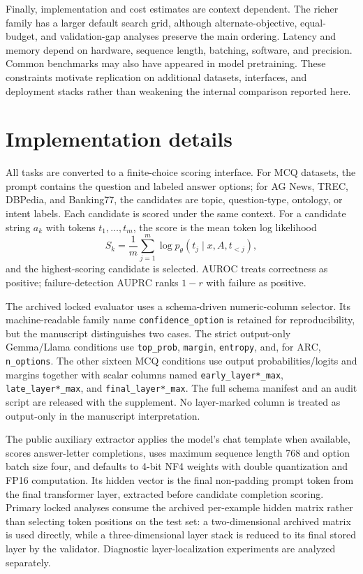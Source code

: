 \documentclass[preprint,12pt,authoryear]{elsarticle}
\begin{document}
Finally, implementation and cost estimates are context dependent. The richer family has a larger default search grid, although alternate-objective, equal-budget, and validation-gap analyses preserve the main ordering. Latency and memory depend on hardware, sequence length, batching, software, and precision. Common benchmarks may also have appeared in model pretraining. These constraints motivate replication on additional datasets, interfaces, and deployment stacks rather than weakening the internal comparison reported here.

\section{Implementation details}
All tasks are converted to a finite-choice scoring interface. For MCQ datasets, the prompt contains the question and labeled answer options; for AG News, TREC, DBPedia, and Banking77, the candidates are topic, question-type, ontology, or intent labels. Each candidate is scored under the same context. For a candidate string $a_k$ with tokens $t_1,\ldots,t_m$, the score is the mean token log likelihood
\begin{equation}
S_k=\frac{1}{m}\sum_{j=1}^{m}\log p_\theta(t_j\mid x,A,t_{<j}),
\end{equation}
and the highest-scoring candidate is selected. AUROC treats correctness as positive; failure-detection AUPRC ranks $1-r$ with failure as positive.

The archived locked evaluator uses a schema-driven numeric-column selector. Its machine-readable family name \texttt{confidence\_option} is retained for reproducibility, but the manuscript distinguishes two cases. The strict output-only Gemma/Llama conditions use \texttt{top\_prob}, \texttt{margin}, \texttt{entropy}, and, for ARC, \texttt{n\_options}. The other sixteen MCQ conditions use output probabilities/logits and margins together with scalar columns named \texttt{early\_layer*\_max}, \texttt{late\_layer*\_max}, and \texttt{final\_layer*\_max}. The full schema manifest and an audit script are released with the supplement. No layer-marked column is treated as output-only in the manuscript interpretation.

The public auxiliary extractor applies the model's chat template when available, scores answer-letter completions, uses maximum sequence length 768 and option batch size four, and defaults to 4-bit NF4 weights with double quantization and FP16 computation. Its hidden vector is the final non-padding prompt token from the final transformer layer, extracted before candidate completion scoring. Primary locked analyses consume the archived per-example hidden matrix rather than selecting token positions on the test set: a two-dimensional archived matrix is used directly, while a three-dimensional layer stack is reduced to its final stored layer by the validator. Diagnostic layer-localization experiments are analyzed separately.
\end{document}
